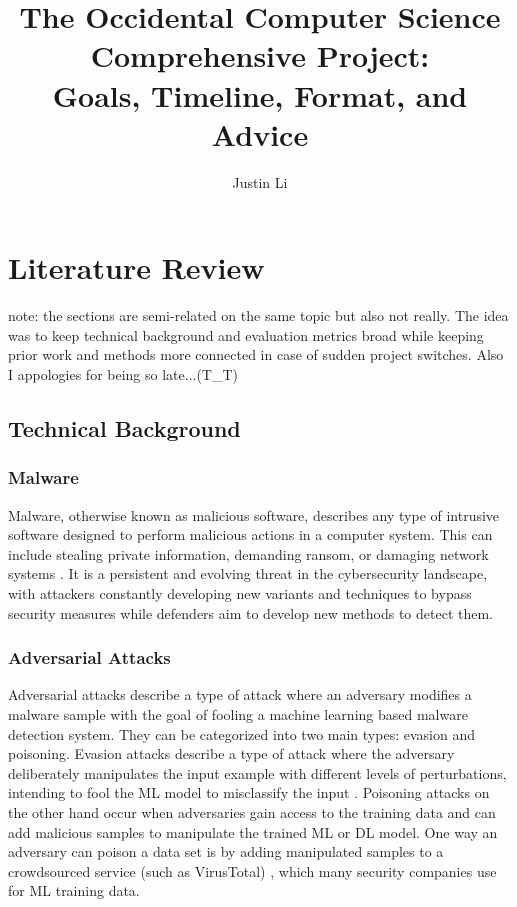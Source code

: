 \documentclass[10pt,twocolumn]{article}
\title{The Occidental Computer Science Comprehensive Project: \\ Goals, Timeline, Format, and Advice}
\author{Justin Li}
\affiliation{Occidental College}
\begin{document}
\maketitle



\section{Literature Review}
\label{sec:paper}
note: the sections are semi-related on the same topic but also not really. The idea was to keep technical background and evaluation metrics broad while keeping prior work and methods more connected in case of sudden project switches. Also I appologies for being so late...(T\_T)


\subsection{Technical Background}

\subsubsection{Malware}
Malware, otherwise known as malicious software, describes any type of intrusive software designed to perform malicious actions in a computer system. This can include stealing private information, demanding ransom, or damaging network systems \cite{Xiang2023}. It is a persistent and evolving threat in the cybersecurity landscape, with attackers constantly developing new variants and techniques to bypass security measures while defenders aim to develop new methods to detect them.

\subsubsection{Adversarial Attacks}
Adversarial attacks describe a type of attack where an adversary modifies a malware sample with the goal of fooling a machine learning based malware detection system. They can be categorized into two main types: evasion and poisoning. Evasion attacks describe a type of attack where the adversary deliberately manipulates the input example with different levels of perturbations, intending to fool the ML model to misclassify the input \cite{Qi2022}. Poisoning attacks on the other hand occur when adversaries gain access to the training data and can add malicious samples to manipulate the trained ML or DL model. One way an adversary can poison a data set is by adding manipulated samples to a crowdsourced service (such as VirusTotal) \cite{Oprea2022}, which many security companies use for ML training data.
\end{document}
